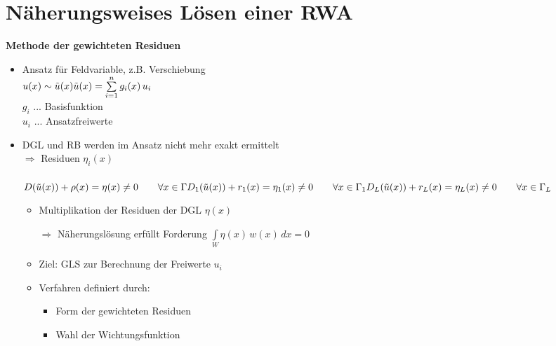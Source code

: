 \section{Näherungsweises Lösen einer RWA}
\textbf{Methode der gewichteten Residuen}
\begin{itemize}
\item Ansatz für Feldvariable, z.B. Verschiebung\\
	\(u(x) \sim \tilde{u} (x)\\\tilde{u}(x) = \sum\limits_{i=1}^n g_i(x)\,u_i\)\\
	$g_i$ ... Basisfunktion\\
	$u_i$ ... Ansatzfreiwerte
\item DGL und RB werden im Ansatz nicht mehr exakt ermittelt\\
	$\Rightarrow$ Residuen $\eta_i (x)$\\\\
	\(D( \tilde{u} (x)) + \rho (x) = \eta (x) \neq 0 \qquad \forall x \in \Gamma \\
	D_1 (\tilde{u}(x)) + r_1 (x) = \eta_1 ( x) \neq 0 \qquad \forall x \in \Gamma_1 \\
	D_L (\tilde{u} (x)) + r_L (x) = \eta_L (x) \neq 0 \qquad \forall x \in \Gamma_L\) 
	\begin{itemize}
	\item Multiplikation der Residuen der DGL $\eta (x)$
	\item[$\Rightarrow$] Näherungslösung erfüllt Forderung	\(\int\limits_W \eta (x)\, w(x) \, dx = 0\) 
	\item Ziel: GLS zur Berechnung der Freiwerte $u_i$
	\item Verfahren definiert durch:
		\begin{itemize}
		\item Form der gewichteten Residuen
		\item Wahl der Wichtungsfunktion
		\end{itemize}
	
	\end{itemize}
\end{itemize}

